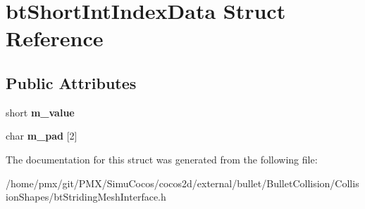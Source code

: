 \hypertarget{structbtShortIntIndexData}{}\section{bt\+Short\+Int\+Index\+Data Struct Reference}
\label{structbtShortIntIndexData}
\subsection*{Public Attributes}
\begin{DoxyCompactItemize}
\item 
\mbox{\label{structbtShortIntIndexData_aae4d06473d1b2056177fb30ee7709359}} 
short {\bfseries m\+\_\+value}
\item 
\mbox{\label{structbtShortIntIndexData_a0f29b19d906a2f5b590f1cf53adbfa5e}} 
char {\bfseries m\+\_\+pad} \mbox{[}2\mbox{]}
\end{DoxyCompactItemize}


The documentation for this struct was generated from the following file\+:\begin{DoxyCompactItemize}
\item 
/home/pmx/git/\+P\+M\+X/\+Simu\+Cocos/cocos2d/external/bullet/\+Bullet\+Collision/\+Collision\+Shapes/bt\+Striding\+Mesh\+Interface.\+h\end{DoxyCompactItemize}
